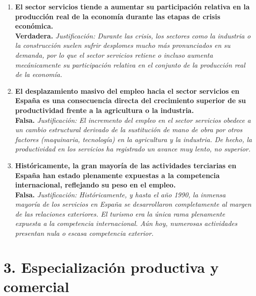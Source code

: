 \begin{enumerate}[label=\textbf{\arabic*.}]
    \item \textbf{El sector servicios tiende a aumentar su participación relativa en la producción real de la economía durante las etapas de crisis económica.} \\
    \textbf{Verdadera.} \textit{Justificación: Durante las crisis, los sectores como la industria o la construcción suelen sufrir desplomes mucho más pronunciados en su demanda, por lo que el sector servicios retiene o incluso aumenta mecánicamente su participación relativa en el conjunto de la producción real de la economía.}

    \item \textbf{El desplazamiento masivo del empleo hacia el sector servicios en España es una consecuencia directa del crecimiento superior de su productividad frente a la agricultura o la industria.} \\
    \textbf{Falsa.} \textit{Justificación: El incremento del empleo en el sector servicios obedece a un cambio estructural derivado de la sustitución de mano de obra por otros factores (maquinaria, tecnología) en la agricultura y la industria. De hecho, la productividad en los servicios ha registrado un avance muy lento, no superior.}

    \item \textbf{Históricamente, la gran mayoría de las actividades terciarias en España han estado plenamente expuestas a la competencia internacional, reflejando su peso en el empleo.} \\
    \textbf{Falsa.} \textit{Justificación: Históricamente, y hasta el año 1990, la inmensa mayoría de los servicios en España se desarrollaron completamente al margen de las relaciones exteriores. El turismo era la única rama plenamente expuesta a la competencia internacional. Aún hoy, numerosas actividades presentan nula o escasa competencia exterior.}

\end{enumerate}

\section*{3. Especialización productiva y comercial}

